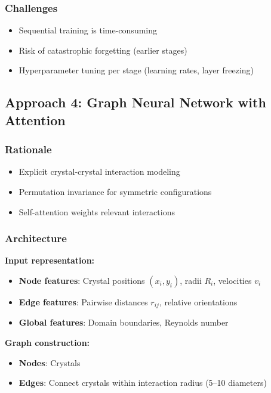 \subsubsection{Challenges}
\begin{itemize}
    \item Sequential training is time-consuming
    \item Risk of catastrophic forgetting (earlier stages)
    \item Hyperparameter tuning per stage (learning rates, layer freezing)
\end{itemize}

\subsection{Approach 4: Graph Neural Network with Attention}

\subsubsection{Rationale}
\begin{itemize}
    \item Explicit crystal-crystal interaction modeling
    \item Permutation invariance for symmetric configurations
    \item Self-attention weights relevant interactions
\end{itemize}

\subsubsection{Architecture}
\textbf{Input representation:}
\begin{itemize}
    \item \textbf{Node features}: Crystal positions $(x_i, y_i)$, radii $R_i$, velocities $v_i$
    \item \textbf{Edge features}: Pairwise distances $r_{ij}$, relative orientations
    \item \textbf{Global features}: Domain boundaries, Reynolds number
\end{itemize}

\textbf{Graph construction:}
\begin{itemize}
    \item \textbf{Nodes}: Crystals
    \item \textbf{Edges}: Connect crystals within interaction radius (5--10 diameters)
\end{itemize}

